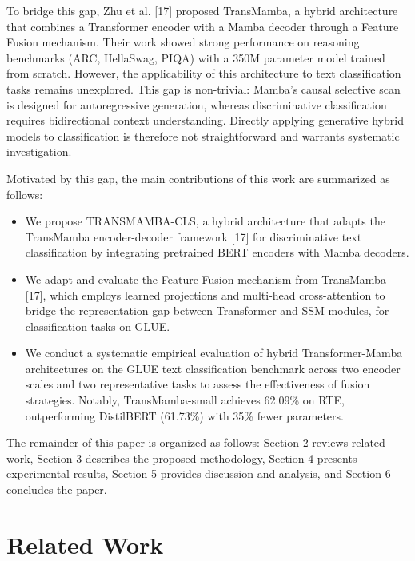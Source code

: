 \documentclass[runningheads]{llncs}
\begin{document}
To bridge this gap, Zhu et al. [17] proposed TransMamba, a hybrid architecture that combines a Transformer encoder with a Mamba decoder through a Feature Fusion mechanism. Their work showed strong performance on reasoning benchmarks (ARC, HellaSwag, PIQA) with a 350M parameter model trained from scratch. However, the applicability of this architecture to text classification tasks remains unexplored. This gap is non-trivial: Mamba's causal selective scan is designed for autoregressive generation, whereas discriminative classification requires bidirectional context understanding. Directly applying generative hybrid models to classification is therefore not straightforward and warrants systematic investigation.

Motivated by this gap, the main contributions of this work are summarized as follows:
\begin{itemize}
    \item We propose TRANSMAMBA-CLS, a hybrid architecture that adapts the TransMamba encoder-decoder framework [17] for discriminative text classification by integrating pretrained BERT encoders with Mamba decoders.
    \item We adapt and evaluate the Feature Fusion mechanism from TransMamba [17], which employs learned projections and multi-head cross-attention to bridge the representation gap between Transformer and SSM modules, for classification tasks on GLUE.
    \item We conduct a systematic empirical evaluation of hybrid Transformer-Mamba architectures on the GLUE text classification benchmark across two encoder scales and two representative tasks to assess the effectiveness of fusion strategies. Notably, TransMamba-small achieves 62.09\% on RTE, outperforming DistilBERT (61.73\%) with 35\% fewer parameters.
\end{itemize}

The remainder of this paper is organized as follows: Section 2 reviews related work, Section 3 describes the proposed methodology, Section 4 presents experimental results, Section 5 provides discussion and analysis, and Section 6 concludes the paper.

\section{Related Work}
\end{document}
